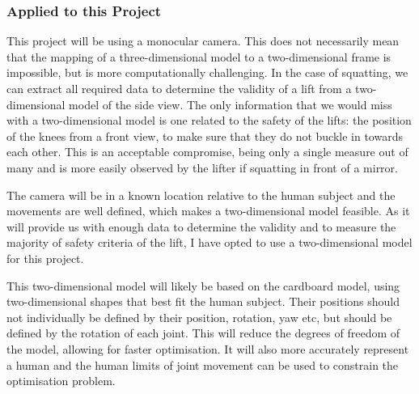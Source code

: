 \subsubsection{Applied to this Project}

This project will be using a monocular camera. This does not necessarily mean that the mapping of a three-dimensional model to a two-dimensional frame is impossible, but is more computationally challenging. In the case of squatting, we can extract all required data to determine the validity of a lift from a two-dimensional model of the side view. The only information that we would miss with a two-dimensional model is one related to the safety of the lifts: the position of the knees from a front view, to make sure that they do not buckle in towards each other. This is an acceptable compromise, being only a single measure out of many and is more easily observed by the lifter if squatting in front of a mirror.

The camera will be in a known location relative to the human subject and the movements are well defined, which makes a two-dimensional model feasible. As it will provide us with enough data to determine the validity and to measure the majority of safety criteria of the lift, I have opted to use a two-dimensional model for this project.

This two-dimensional model will likely be based on the cardboard model, using two-dimensional shapes that best fit the human subject. Their positions should not individually be defined by their position, rotation, yaw etc, but should be defined by the rotation of each joint. This will reduce the degrees of freedom of the model, allowing for faster optimisation. It will also more accurately represent a human and the human limits of joint movement can be used to constrain the optimisation problem.